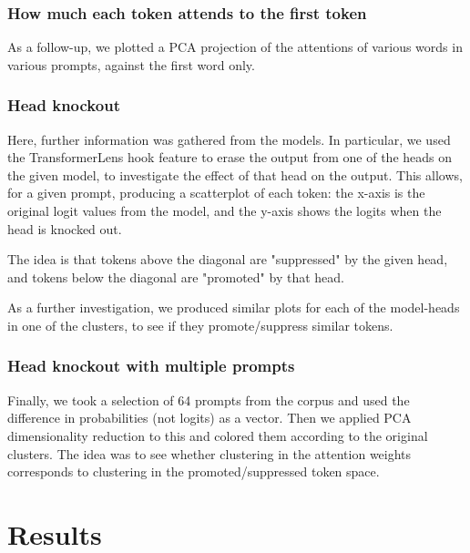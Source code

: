 \documentclass{article}
\begin{document}
\subsubsection{How much each token attends to the first token}
As a follow-up, we plotted a PCA projection of the attentions of various words in various prompts, against the first word only.

\subsubsection{Head knockout}
Here, further information was gathered from the models. In particular, we used the TransformerLens hook feature to erase the output from one of the heads on the given model, to investigate the effect of that head on the output. This allows, for a given prompt, producing a scatterplot of each token: the x-axis is the original logit values from the model, and the y-axis shows the logits when the head is knocked out.

The idea is that tokens above the diagonal are "suppressed" by the given head, and tokens below the diagonal are "promoted" by that head.

As a further investigation, we produced similar plots for each of the model-heads in one of the clusters, to see if they promote/suppress similar tokens.

\subsubsection{Head knockout with multiple prompts}
Finally, we took a selection of 64 prompts from the corpus and used the difference in probabilities (not logits) as a vector. Then we applied PCA dimensionality reduction to this and colored them according to the original clusters. The idea was to see whether clustering in the attention weights corresponds to clustering in the promoted/suppressed token space.

\section{Results}
\end{document}
